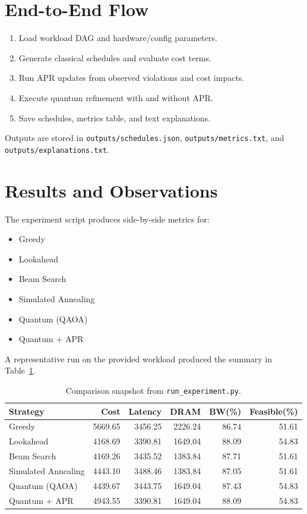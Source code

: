 \documentclass[11pt]{article}
\begin{document}
\section{End-to-End Flow}
\begin{enumerate}
    \item Load workload DAG and hardware/config parameters.
    \item Generate classical schedules and evaluate cost terms.
    \item Run APR updates from observed violations and cost impacts.
    \item Execute quantum refinement with and without APR.
    \item Save schedules, metrics table, and text explanations.
\end{enumerate}

Outputs are stored in \texttt{outputs/schedules.json}, \texttt{outputs/metrics.txt}, and \texttt{outputs/explanations.txt}.

\section{Results and Observations}
The experiment script produces side-by-side metrics for:
\begin{itemize}
    \item Greedy
    \item Lookahead
    \item Beam Search
    \item Simulated Annealing
    \item Quantum (QAOA)
    \item Quantum + APR
\end{itemize}

A representative run on the provided workload produced the summary in Table~\ref{tab:mainresults}.

\begin{table}[h]
\centering
\begin{tabular}{lrrrrr}
\toprule
Strategy & Cost & Latency & DRAM & BW(\%) & Feasible(\%) \\
\midrule
Greedy & 5669.65 & 3456.25 & 2226.24 & 86.74 & 51.61 \\
Lookahead & 4168.69 & 3390.81 & 1649.04 & 88.09 & 54.83 \\
Beam Search & 4169.26 & 3435.52 & 1383.84 & 87.71 & 51.61 \\
Simulated Annealing & 4443.10 & 3488.46 & 1383.84 & 87.05 & 51.61 \\
Quantum (QAOA) & 4439.67 & 3443.75 & 1649.04 & 87.43 & 54.83 \\
Quantum + APR & 4943.55 & 3390.81 & 1649.04 & 88.09 & 54.83 \\
\bottomrule
\end{tabular}
\caption{Comparison snapshot from \texttt{run\_experiment.py}.}
\label{tab:mainresults}
\end{table}
\end{document}
